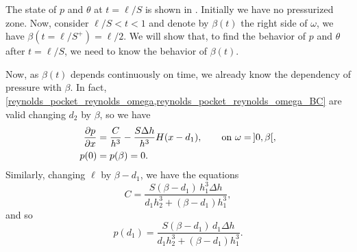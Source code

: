 The state of $p$ and $\theta$ at $t=\ell/S$ is shown in . Initially we have no pressurized zone. Now, consider $\ell/S<t<1$ and denote by $\beta(t)$ the right side of $\omega$, we have $\beta(t=\ell/S^+)=\ell/2$. We will show that, to find the behavior of $p$ and $\theta$ after $t=\ell/S$, we need to know the behavior of $\beta(t)$.

Now, as $\beta(t)$ depends continuously on time, we already know the dependency of pressure with $\beta$. In fact, \eqref{reynolds_pocket_reynolds_omega,reynolds_pocket_reynolds_omega_BC} are valid changing $d_2$ by $\beta$, so we have
\begin{align}
\parder{p}{x}&=\frac{C}{h^3}-\frac{S\Delta h}{h^3}H(x-d_1),\qquad\text{on }\omega=\,]0,\beta[,\label{eq:reynolds_pocket_ea_omega}\\
p(0)&=p(\beta)=0.\label{eq:reynolds_pocket_ea_omega_BC}
\end{align}
Similarly, changing $\ell$ by $\beta-d_1$, we have the equations
\begin{equation}
C=\frac{S(\beta-d_1) \,h_1^3\Delta h }{d_1h_2^3+(\beta-d_1) h_1^3},\label{eq:pocket_ea_def_C}
\end{equation}
and so 
\begin{equation}
p(d_1)=\frac{S(\beta-d_1) \,d_1\Delta h }{d_1h_2^3+(\beta-d_1) h_1^3}.\label{eq:ea_pocket_reynolds_pd1}
\end{equation}



